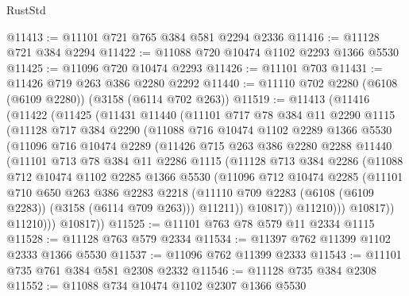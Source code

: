 \begin{lexlean}{RustStd}
\begin{coremodule}
@11413 := @11101 @721 @765 @384 @581 @2294 @2336
@11416 := @11128 @721 @384 @2294
@11422 := @11088 @720 @10474 @1102 @2293 @1366 @5530
@11425 := @11096 @720 @10474 @2293
@11426 := @11101 @703
@11431 := @11426 @719 @263 @386 @2280 @2292
@11440 := @11110 @702 @2280 (@6108 (@6109 @2280)) (@3158 (@6114 @702 @263))
@11519 := @11413
    (@11416
      (@11422
        (@11425
          (@11431
            @11440
            (@11101
              @717
              @78
              @384
              @11
              @2290
              @1115
              (@11128
                @717
                @384
                @2290
                (@11088
                  @716
                  @10474
                  @1102
                  @2289
                  @1366
                  @5530
                  (@11096
                    @716
                    @10474
                    @2289
                    (@11426
                      @715
                      @263
                      @386
                      @2280
                      @2288
                      @11440
                      (@11101
                        @713
                        @78
                        @384
                        @11
                        @2286
                        @1115
                        (@11128
                          @713
                          @384
                          @2286
                          (@11088
                            @712
                            @10474
                            @1102
                            @2285
                            @1366
                            @5530
                            (@11096
                              @712
                              @10474
                              @2285
                              (@11101
                                @710
                                @650
                                @263
                                @386
                                @2283
                                @2218
                                (@11110 @709 @2283 (@6108 (@6109 @2283)) (@3158 (@6114 @709 @263)))
                                @11211))
                            @10817))
                        @11210)))
                  @10817))
              @11210)))
        @10817))
@11525 := @11101 @763 @78 @579 @11 @2334 @1115
@11528 := @11128 @763 @579 @2334
@11534 := @11397 @762 @11399 @1102 @2333 @1366 @5530
@11537 := @11096 @762 @11399 @2333
@11543 := @11101 @735 @761 @384 @581 @2308 @2332
@11546 := @11128 @735 @384 @2308
@11552 := @11088 @734 @10474 @1102 @2307 @1366 @5530

\end{coremodule}
\end{lexlean}
